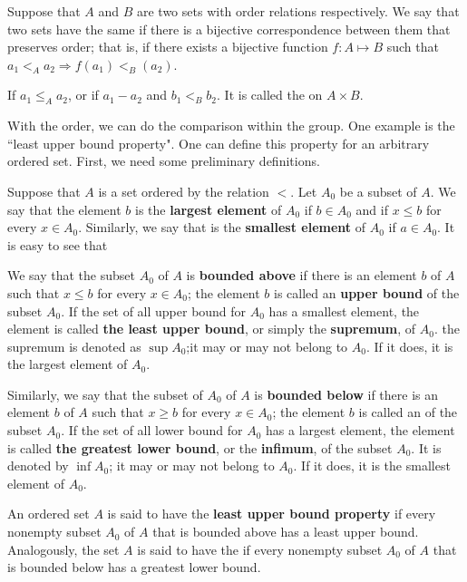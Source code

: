 \begin{definition}
Suppose that $A$ and $B$ are two sets with order relations respectively. We say that two sets have the same \textbf{} if there is a bijective correspondence between them that preserves order; that is, if there exists a bijective function $f:A \mapsto B$ such that $a_1 <_A a_2 \Rightarrow f(a_1) <_B (a_2)$.
\end{definition}

\begin{definition}
If $a_1 \leq_A a_2$, or if $a_1 - a_2$ and $b_1 <_B b_2$. It is called the \textbf{} on $A \times B$. 
\end{definition}

With the order, we can do the comparison within the group. One example is the ``least upper bound property". One can define this property for an arbitrary ordered set. First, we need some preliminary definitions.

Suppose that $A$ is a set ordered by the relation $<$. Let $A_0$ be a subset of $A$. We say that the element $b$ is the \textbf{largest element} of $A_0$ if $b \in A_0$ and if $x \leq b$ for every  $x \in A_0$. Similarly, we say that is the \textbf{smallest element} of $A_0$ if $a \in A_0$. It is easy to see that 

We say that the subset $A_0$ of $A$ is \textbf{bounded above} if there is an element $b$ of $A$ such that $x \leq b$ for every $x \in A_0$; the element $b$ is called an \textbf{upper bound} of the subset $A_0$. If the set of all upper bound for $A_0$ has a smallest element, the element is called \textbf{the least upper bound}, or simply the \textbf{supremum}, of $A_0$. the supremum is denoted as $\sup{A_0}$;it may or may not belong to $A_0$. If it does, it is the largest element of $A_0$.

Similarly, we say that the subset of $A_0$ of $A$ is \textbf{bounded below} if there is an element $b$ of $A$ such that $x \geq b$ for every $x \in A_0$; the element $b$ is called an  of the subset $A_0$. If the set of all lower bound for $A_0$ has a largest element, the element is called \textbf{the greatest lower bound}, or the \textbf{infimum}, of the subset $A_0$. It is denoted by $\inf{A_0}$; it may or may not belong to $A_0$. If it does, it is the smallest element of $A_0$.

\begin{definition}
An ordered set $A$ is said to have the \textbf{least upper bound property} if every nonempty subset $A_0$ of $A$ that is bounded above has a least upper bound. Analogously, the set $A$ is said to have the \textbf{} if every nonempty subset $A_0$ of $A$ that is bounded below has a greatest lower bound.
\end{definition}

